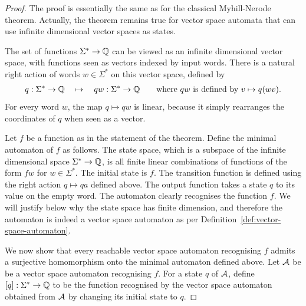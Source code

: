 \begin{proof}
	The proof is essentially the same as for the classical Myhill-Nerode theorem.  Actually, the theorem remains true for vector space automata that can use  infinite dimensional vector spaces as states.


The set of functions $\Sigma^* \to \mathbb Q$ can be viewed as    an infinite dimensional  vector space, with functions seen as vectors indexed by input words. There is a natural right action of words $w \in \Sigma^*$  on this vector space, defined by
\begin{align*}
  q : \Sigma^* \to \mathbb Q \quad \mapsto \quad qw : \Sigma^* \to \mathbb Q \qquad \text{where $qw$ is defined by $v \mapsto q(wv)$}.
\end{align*}
For every word $w$, the map $q \mapsto qw$   is  linear, because it simply rearranges the coordinates of $q$ when seen as a vector.  

Let $f$ be a function as in the statement of the theorem.
Define the {minimal automaton} of $f$ as follows. The state space, which is a subspace of the infinite dimensional space $\Sigma^* \to \mathbb Q$, is all finite linear combinations of  functions of the form $fw$ for $w \in \Sigma^*$. The initial state is $f$.  The transition function is defined using the right action $q \mapsto qa$ defined above. The output function takes a state $q$ to its value on the empty word. The automaton clearly recognises the function $f$. We will justify below why the state space has finite dimension, and therefore the automaton is indeed a vector space automaton as per Definition~\ref{def:vector-space-automaton}.

We now show that every reachable vector space automaton recognising $f$ admits a surjective homomorphism onto the minimal automaton defined above. Let 
 $\mathcal{A}$ be be  a vector space automaton recognising $f$. For a state $q$ of $\mathcal{A}$, define $[q] : \Sigma^* \to  \mathbb Q$ to be the function  recognised by the vector space automaton obtained from $\mathcal{A}$ by changing its initial state to $q$.   


\end{proof}
